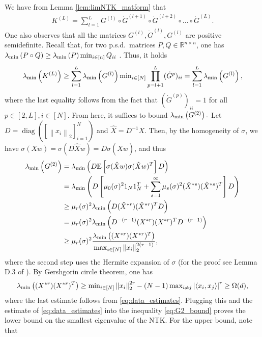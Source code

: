 \documentclass[11pt]{article}
\def\RR{\mathbb{R}}
\def\diag{\operatorname{\mathop{diag}}}
\newcommand{\E}{\mathbb{E}}
\newcommand{\inner}[1]{\left\langle#1\right\rangle}
\newcommand{\norm}[1]{\left\|#1\right\|}
\newcommand{\abs}[1]{\left|#1\right|}
\newcommand{\evmin}[1]{\lambda_{\rm min}\left(#1\right)}
\def\min{\mathop{\rm min}\nolimits}
\def\max{\mathop{\rm max}\nolimits}
\begin{document}
    We have from Lemma \ref{lem:limNTK_matform} that
    \begin{align*}
	K^{(L)} = \sum_{l=1}^{L} G^{(l)} \circ \dot{G}^{(l+1)}\circ\dot{G}^{(l+2)}\circ\ldots\circ\dot{G}^{(L)} .
    \end{align*}
    One also observes that all the matrices $G^{(l)},\dot{G}^{(l)},G^{(l)}$ are positive semidefinite. 
    Recall that, for two p.s.d.\ matrices $P,Q\in\RR^{n\times n}$, 
    one has $\evmin{P\circ Q}\geq\evmin{P}\min_{i\in[n]}Q_{ii}$ \citep{schur1911bemerkungen}.
    Thus, it holds
    \begin{align*}	
	\evmin{K^{(L)}} 
	\geq \sum_{l=1}^{L} \evmin{G^{(l)}} \min_{i\in[N]} \prod_{p=l+1}^{L} (\dot{G}^p)_{ii} 
	= \sum_{l=1}^{L} \evmin{G^{(l)}},
    \end{align*}
    where the last equality follows from the fact that $(\dot{G}^{(p)})_{ii}=1$ for all $p\in[2,L],i\in[N].$
    From here, it suffices to bound $\evmin{G^{(2)}}.$
    Let $D=\diag([\norm{x_i}_2]_{i=1}^{N})$ and $\hat{X}=D^{-1}X.$ 
    Then, by the homogeneity of $\sigma$, we have
    $\sigma(Xw)=\sigma(D\hat{X}w)=D\sigma(\hat{X}w)$, and thus 
    \begin{align}\label{eq:G2_bound}
	\evmin{ G^{(2)} } 
	&=\evmin{ D \E\left[\sigma(\hat{X}w)\sigma(\hat{X}w)^T\right] D } \nonumber\\
	&=\evmin{D \left[\mu_0(\sigma)^2 1_N 1_N^T + \sum_{s=1}^{\infty}\mu_s(\sigma)^2 (\hat{X}^{*s}) (\hat{X}^{*s})^T \right] D} \nonumber\\
	&\geq\mu_r(\sigma)^2 \evmin{D (\hat{X}^{*r}) (\hat{X}^{*r})^T D} \nonumber\\
	&=\mu_r(\sigma)^2 \evmin{D^{-(r-1)} (X^{*r}) (X^{*r})^T D^{-(r-1)}} \nonumber\\
	&\geq\mu_r(\sigma)^2 \frac{\evmin{(X^{*r})(X^{*r})^T}}{\max_{i\in [N]}\norm{x_i}_2^{2(r-1)}} ,
    \end{align}
    where the second step uses the Hermite expansion of $\sigma$ (for the proof see Lemma D.3 of \citep{QuynhMarco2020}).
    By Gershgorin circle theorem, one has
    \begin{align*}
	\evmin{(X^{*r})(X^{*r})^T} 
	\geq \min_{i\in[N]} \norm{x_i}_2^{2r} - (N-1) \max_{i\neq j} \abs{\inner{x_i,x_j}}^r
	\geq\Omega(d),
    \end{align*}    
    where the last estimate follows from \eqref{eq:data_estimates}.
    Plugging this and the estimate of \eqref{eq:data_estimates} into the inequality \eqref{eq:G2_bound} proves the lower bound on the smallest eigenvalue of the NTK.
    For the upper bound, note that
\end{document}

